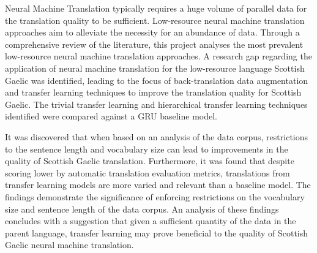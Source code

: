 
Neural Machine Translation typically requires a huge volume of parallel data for the translation quality to be sufficient. Low-resource neural machine translation approaches aim to alleviate the necessity for an abundance of data.
Through a comprehensive review of the literature, this project analyses the most prevalent low-resource neural machine translation approaches. A research gap regarding the application of neural machine translation for the low-resource language Scottish Gaelic was identified, leading to the focus of back-translation data augmentation and transfer learning techniques to improve the translation quality for Scottish Gaelic. The trivial transfer learning and hierarchical transfer learning techniques identified were compared against a GRU baseline model.

It was discovered that when based on an analysis of the data corpus, restrictions to the sentence length and vocabulary size can lead to improvements in the quality of Scottish Gaelic translation. Furthermore, it was found that despite scoring lower by automatic translation evaluation metrics, translations from transfer learning models are more varied and relevant than a baseline model.
The findings demonstrate the significance of enforcing restrictions on the vocabulary size and sentence length of the data corpus. An analysis of these findings concludes with a suggestion that given a sufficient quantity of the data in the parent language, transfer learning may prove beneficial to the quality of Scottish Gaelic neural machine translation.
